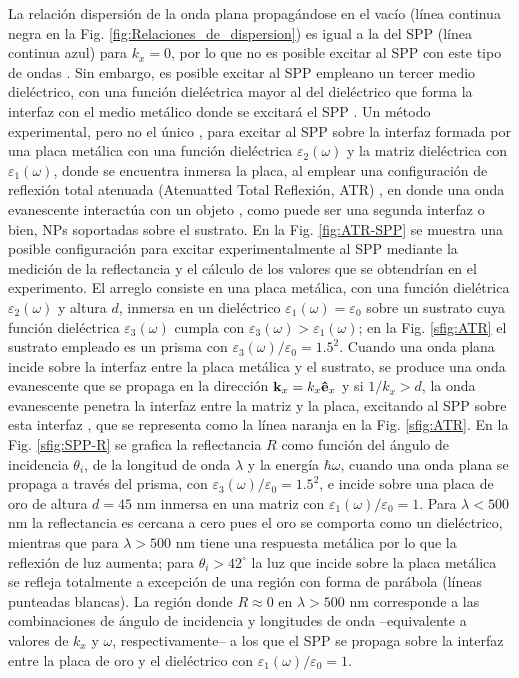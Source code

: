 La relación dispersión de la onda plana propagándose en el vacío (línea continua negra en la Fig. \ref{fig:Relaciones_de_dispersion})  es igual a la del SPP (línea continua azul) para  $k_x=0$, por lo que no es posible excitar al SPP con este tipo de ondas \cite{trugler2011properties}. Sin embargo, es posible excitar al SPP empleano un tercer medio dieléctrico, con una función dieléctrica mayor al del dieléctrico que forma la interfaz con el medio metálico donde se excitará el SPP \cite{trugler2011properties}. Un método experimental, pero no el único \cite{maier2007plasmonics}, para excitar al SPP sobre la interfaz formada por una placa metálica con una función dieléctrica $\varepsilon_2(\omega)$ y la matriz dieléctrica con $\varepsilon_1(\omega)$, donde se encuentra inmersa la placa, al emplear una configuración de reflexión total atenuada (Atenuatted Total Reflexión, ATR) \cite{kabashin2009plasmonic}, en donde una onda evanescente interactúa con un objeto \cite{hecht1998optics}, como puede ser una segunda interfaz o bien, NPs soportadas sobre el sustrato. En la Fig. \ref{fig:ATR-SPP} se muestra una posible configuración para excitar experimentalmente al SPP mediante la medición de la reflectancia y el cálculo de los valores que se obtendrían en el experimento. El arreglo consiste en una  placa metálica, con una función dielétrica $\varepsilon_2(\omega)$ y altura $d$, inmersa en un dieléctrico $\varepsilon_1(\omega)=\varepsilon_0$ sobre un sustrato cuya función dieléctrica $\varepsilon_3(\omega)$ cumpla con $\varepsilon_3(\omega)>\varepsilon_1(\omega)$; en la Fig. \ref{sfig:ATR} el sustrato empleado es un prisma con $\varepsilon_3(\omega)/\varepsilon_0=1.5^2$. Cuando una onda plana incide sobre la interfaz entre la placa metálica y el sustrato, se produce una onda evanescente que se propaga en la dirección $\vb{k}_x=k_x\vu{e}_x$ y si $1/k_x>d$, la onda evanescente penetra la interfaz entre la matriz y la placa, excitando al SPP sobre esta interfaz \cite{trugler2011properties}, que se representa como la línea naranja en la Fig. \ref{sfig:ATR}. En la Fig. \ref{sfig:SPP-R} se grafica la reflectancia $R$ como función del ángulo de incidencia $\theta_i$, de la longitud de onda $\lambda$ y la energía $\hbar\omega$, cuando una onda plana se propaga a través del prisma, con $\varepsilon_3(\omega)/\varepsilon_0 = 1.5^2$, e incide sobre una placa de oro de altura $d=45$ nm inmersa en una matriz con $\varepsilon_1(\omega)/\varepsilon_0 = 1$. Para $\lambda<500$ nm la reflectancia es cercana a cero pues el oro se comporta como un dieléctrico, mientras que para $\lambda>500$ nm tiene una respuesta metálica por lo que la reflexión de luz aumenta; para $\theta_i>42^\circ$ la luz que incide sobre la placa metálica se refleja totalmente a excepción de una región con forma de parábola (líneas punteadas blancas). La región donde $R\approx 0$ en $\lambda>500$ nm corresponde a las combinaciones de ángulo de incidencia y longitudes de onda --equivalente a valores de $k_x$ y $\omega$, respectivamente-- a los que el SPP se propaga sobre la interfaz entre la placa de oro y el dieléctrico con $\varepsilon_1(\omega)/\varepsilon_0 = 1$.
			
